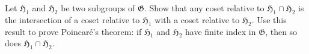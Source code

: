 Let $\mathfrak{H}_1$ and $\mathfrak{H}_2$ be two subgroups of $\mathfrak{G}$. Show that any coset relative to $\mathfrak{H}_1 \cap \mathfrak{H}_2$ is the intersection of a coset relative to $\mathfrak{H}_1$ with a coset relative to $\mathfrak{H}_2$. Use this result to prove Poincaré's theorem: if $\mathfrak{H}_1$ and $\mathfrak{H}_2$ have finite index in $\mathfrak{G}$, then so does $\mathfrak{H}_1 \cap \mathfrak{H}_2$.
